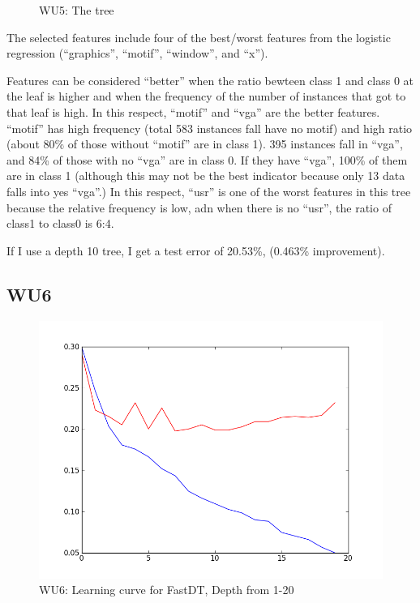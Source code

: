 \documentclass[a4paper,11pt]{article}
\begin{document}
\begin{figure}[!ht]
  \caption{WU5: The tree}
  \centering
\end{figure}

The selected features include four of the best/worst features from
the logistic regression (``graphics'', ``motif'', ``window'', and ``x'').

Features can be considered ``better'' when the ratio bewteen class 1
and class 0 at the leaf is higher and when the frequency of the number
of instances that got to that leaf is high. In this respect, ``motif''
and ``vga'' are the better features. ``motif'' has high frequency
(total 583 instances fall have no motif) and high ratio (about 80\% of
those without ``motif'' are in class 1).  395 instances fall in
``vga'', and 84\% of those with no ``vga'' are in class 0. If they
have ``vga'', 100\% of them are in class 1 (although this may not be the
best indicator because only 13 data falls into yes ``vga''.) 
In this respect, ``usr'' is one of the worst features in this tree
because the relative frequency is low, adn when there is no ``usr'',
the ratio of class1 to class0 is 6:4.

If I use a depth 10 tree, I get a test error of 20.53\%, (0.463\%
improvement).

\subsection{WU6}
\textsf{}
\begin{figure}[h!]

  \centering
  \includegraphics[width=5in]{WU6/learningCurve_FastDT.png}
    \caption{WU6: Learning curve for FastDT, Depth from 1-20}
  \end{figure}
  
\end{document}
